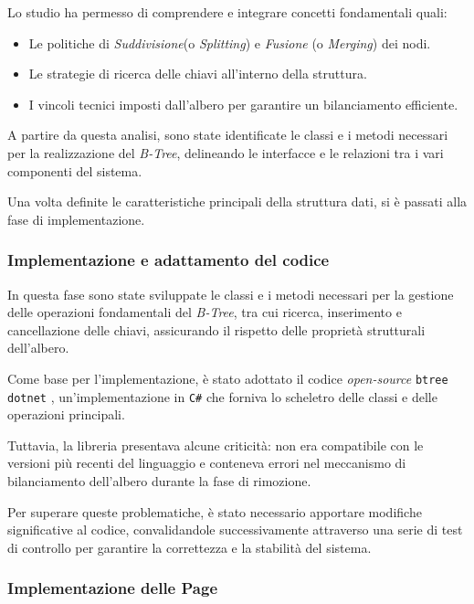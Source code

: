 \documentclass[12pt,a4paper,openright,twoside]{book}
\begin{document}
                Lo studio ha permesso di comprendere e integrare concetti fondamentali quali:
                \begin{itemize}
                    \item Le politiche di \textit{Suddivisione}(o \textit{Splitting}) e \textit{Fusione} (o \textit{Merging}) dei nodi.
                    \item Le strategie di ricerca delle chiavi all'interno della struttura.
                    \item I vincoli tecnici imposti dall'albero per garantire un bilanciamento efficiente.
                \end{itemize}

                A partire da questa analisi, sono state identificate le classi e i metodi necessari per la realizzazione del \textit{B-Tree}, delineando le interfacce e le relazioni tra i vari componenti del sistema.

                Una volta definite le caratteristiche principali della struttura dati, si è passati alla fase di implementazione.

            \subsubsection{Implementazione e adattamento del codice}

                In questa fase sono state sviluppate le classi e i metodi necessari per la gestione delle operazioni fondamentali del \textit{B-Tree}, tra cui ricerca, inserimento e cancellazione delle chiavi, assicurando il rispetto delle proprietà strutturali dell’albero.

                Come base per l’implementazione, è stato adottato il codice \textit{open-source} \texttt{btree dotnet} \cite{rsdcastro_btree_dotnet}, un’implementazione in \texttt{C\#} che forniva lo scheletro delle classi e delle operazioni principali.

                Tuttavia, la libreria presentava alcune criticità: non era compatibile con le versioni più recenti del linguaggio e conteneva errori nel meccanismo di bilanciamento dell’albero durante la fase di rimozione.

                Per superare queste problematiche, è stato necessario apportare modifiche significative al codice, convalidandole successivamente attraverso una serie di test di controllo per garantire la correttezza e la stabilità del sistema.

            \subsubsection{Implementazione delle Page}
\end{document}
